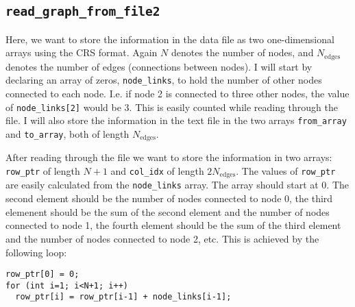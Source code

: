 \documentclass[reprint, english,notitlepage,nofootinbib]{revtex4-1}  %
\begin{document}
\subsection{\texttt{read\_graph\_from\_file2}} \label{sect:read2}

Here, we want to store the information in the data file as two one-dimensional arrays using the CRS format. Again \(N\) denotes the number of nodes, and \(N_{\text{edges}}\) denotes the number of edges (connections between nodes). I will start by declaring an array of zeros, \verb|node_links|, to hold the number of other nodes connected to each node. I.e. if node 2 is connected to three other nodes, the value of \verb|node_links[2]| would be 3. This is easily counted while reading through the file. I will also store the information in the text file in the two arrays \verb|from_array| and \verb|to_array|, both of length \(N_{\text{edges}}\).

After reading through the file we want to store the information in two arrays: \verb|row_ptr| of length \(N+1\) and \verb|col_idx| of length \(2 N_{\text{edges}}\). The values of \verb|row_ptr| are easily calculated from the \verb|node_links| array. The array should start at 0. The second element should be the number of nodes connected to node 0, the third elemenent should be the sum of the second element and the number of nodes connected to node 1, the fourth element should be the sum of the third element and the number of nodes connected to node 2, etc. This is achieved by the following loop:
\begin{verbatim}
row_ptr[0] = 0;
for (int i=1; i<N+1; i++)
  row_ptr[i] = row_ptr[i-1] + node_links[i-1];
\end{verbatim}
\end{document}
